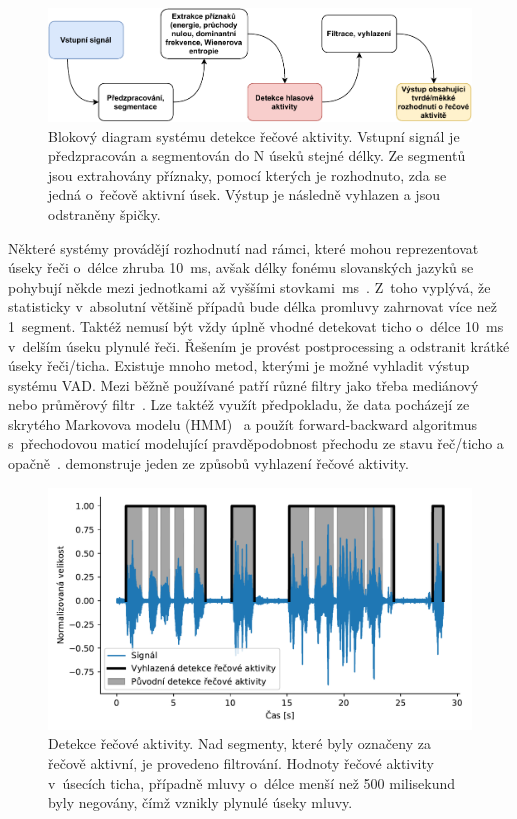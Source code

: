 \begin{figure}[ht]
  \centering
  \includegraphics[width=\linewidth]{obrazky-figures/vad_diagram.pdf}
  \caption{Blokový diagram systému detekce řečové aktivity. Vstupní signál je předzpracován a segmentován do N úseků stejné délky. Ze segmentů jsou extrahovány příznaky, pomocí kterých je rozhodnuto, zda se jedná o~řečově aktivní úsek. Výstup je následně vyhlazen a jsou odstraněny špičky.}
  \label{fig:VAD_graph}
\end{figure}


Některé systémy provádějí rozhodnutí nad rámci, které mohou reprezentovat úseky řeči o~délce zhruba 10~ms, avšak délky fonému slovanských jazyků se pohybují někde mezi jednotkami až vyššími stovkami~ms~\cite{Pl_phonemes}. Z~toho vyplývá, že statisticky v~absolutní většině případů bude délka promluvy zahrnovat více než 1~segment. Taktéž nemusí být vždy úplně vhodné detekovat ticho o~délce 10~ms v~delším úseku plynulé řeči. Řešením je provést postprocessing a odstranit krátké úseky řeči/ticha. Existuje mnoho metod, kterými je možné vyhladit výstup systému VAD. Mezi běžně používané patří různé filtry jako třeba mediánový nebo průměrový filtr~\cite{gupta_filters}. Lze taktéž využít předpokladu, že data pocházejí ze skrytého Markovova modelu (HMM)~\cite{Cernocky_ZRE} a použít forward-backward algoritmus s~přechodovou maticí modelující pravděpodobnost přechodu ze stavu řeč/ticho a opačně~\cite{Bishop_pattern}.  demonstruje jeden ze způsobů vyhlazení řečové aktivity.

\begin{figure}[ht]
  \centering
  \includegraphics[width=\linewidth]{obrazky-figures/signal_vad_smooth.pdf}
  \caption{Detekce řečové aktivity. Nad segmenty, které byly označeny za řečově aktivní, je provedeno filtrování. Hodnoty řečové aktivity v~úsecích ticha, případně mluvy o~délce menší než 500 milisekund byly negovány, čímž vznikly plynulé úseky mluvy.}
  \label{fig:VAD_smooth}
\end{figure}

